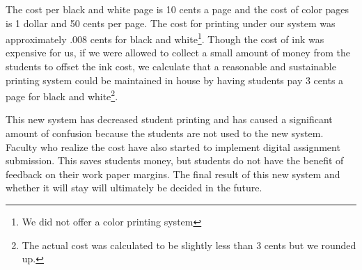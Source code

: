 The cost per black and white page is 10 cents a page and the cost of color pages is 1 dollar and 50 cents per page.  The cost for printing under our system was approximately .008 cents for black and white\footnote{We did not offer a color printing system}.  Though the cost of ink was expensive for us, if we were allowed to collect a small amount of money from the students to offset the ink cost, we calculate that a reasonable and sustainable printing system could be maintained in house by having students pay 3 cents a page for black and white\footnote{The actual cost was calculated to be slightly less than 3 cents but we rounded up.}.  

This new system has decreased student printing and has caused a significant amount of confusion because the students are not used to the new system.  Faculty who realize the cost have also started to implement digital assignment submission.  This saves students money, but students do not have the benefit of feedback on their work paper margins.  The final result of this new system and whether it will stay will ultimately be decided in the future.  

